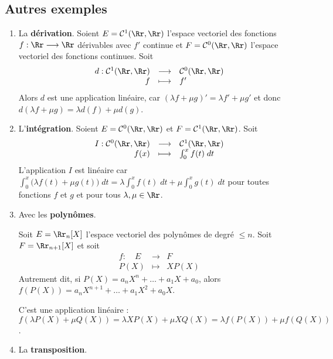 \documentclass[class=report,crop=false]{standalone}
\begin{document}
\subsection{Autres exemples}

\begin{enumerate}
  \item La \textbf{dérivation}.
Soient $E  = \mathcal{C}^1 (\Rr,\Rr)$ l'espace vectoriel des fonctions
$f: \Rr \longrightarrow \Rr$ dérivables avec $f'$ continue et
$F = \mathcal{C}^0 (\Rr,\Rr)$ l'espace vectoriel des fonctions continues.
Soit
$$\begin{array}{rcl}
d : \mathcal{C}^1 (\Rr,\Rr) & \longrightarrow & \mathcal{C}^0 (\Rr,\Rr)  \\
f & \longmapsto & f'
  \end{array}$$
Alors $d$ est une application linéaire,
car $(\lambda f + \mu g)' = \lambda f' + \mu g'$ et donc $d(\lambda f + \mu g)=\lambda d(f) + \mu d(g)$.

\item L'{\bf intégration}.
Soient $E = \mathcal{C}^0(\Rr,\Rr)$ et $F = \mathcal{C}^1(\Rr,\Rr)$.
Soit
$$\begin{array}{rcl}
  I : \mathcal{C}^0(\Rr,\Rr) & \longrightarrow & \mathcal{C}^1(\Rr,\Rr)\\
  f(x) & \longmapsto & \int_0^x f(t) \; dt
  \end{array}$$
L'application $I$ est linéaire car
$\int_0^x \big(\lambda f(t) + \mu g(t)\big) \; dt
= \lambda \int_0^x f(t) \; dt + \mu \int_0^x g(t) \; dt$
pour toutes fonctions $f$ et $g$ et pour tous $\lambda,\mu \in \Rr$.


  \item Avec les \textbf{polynômes}.

Soit $E=\Rr_n[X]$ l'espace vectoriel des polynômes de degré $\le n$.
Soit $F = \Rr_{n+1}[X]$ et soit
$$\begin{array}{rcl}
f : \quad E & \longrightarrow & F \\
P(X) & \longmapsto & X P(X)
  \end{array}$$
Autrement dit, si $P(X) = a_n X^n + \dots + a_1 X + a_0$,
alors $f(P(X)) =  a_n X^{n+1} + \dots + a_1 X^2 + a_0 X$.

C'est une application linéaire :
$f(\lambda P(X)+ \mu Q(X)) = \lambda X P(X) + \mu X Q(X) = \lambda f(P(X)) + \mu f(Q(X))$.

  \item La \textbf{transposition}.


\end{enumerate}
\end{document}
